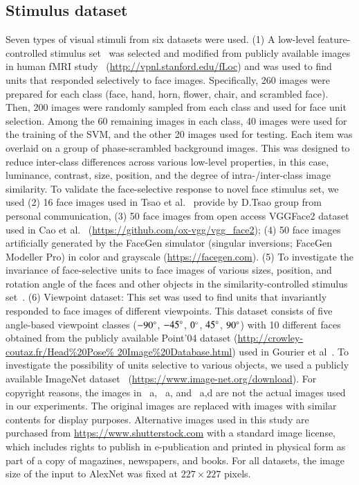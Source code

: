 \documentclass[final,3p,times,twocolumn]{elsarticle}
\begin{document}
\subsection{Stimulus dataset}
Seven types of visual stimuli from six datasets were used.
(1) A low-level feature-controlled stimulus set~\cite{stigliani2015temporal} was selected and modified from publicly available images in human fMRI study~\cite{stigliani2015temporal} (\url{http://vpnl.stanford.edu/fLoc}) 
and was used to find units that responded selectively to face images.
Specifically, 260 images were prepared for each class (face, hand, horn, flower, chair, and scrambled face).
Then, 200 images were randomly sampled from each class and used for face unit selection.
Among the 60 remaining images in each class, 40 images were used for the training of the SVM, 
and the other 20 images used for testing.
Each item was overlaid on a group of phase-scrambled background images.
This was designed to reduce inter-class differences across various low-level properties,
in this case, luminance, contrast, size, position, and the degree of intra-/inter-class image similarity.
To validate the face-selective response to novel face stimulus set, we used (2) 16 face images used in Tsao et al.~\cite{tsao2006cortical,freiwald2010functional} provide by D.Tsao group from personal communication,
(3) 50 face images from open access VGGFace2 dataset used in Cao et al.~\cite{cao2018vggface2} (\url{https://github.com/ox-vgg/vgg_face2});
(4) 50 face images artificially generated by the FaceGen simulator (singular inversions; FaceGen Modeller Pro) in color and grayscale (\url{https://facegen.com}).
(5) To investigate the invariance of face-selective units to face images of various sizes, position, and rotation angle of the faces and other objects in the similarity-controlled stimulus set~\cite{stigliani2015temporal}.
(6) Viewpoint dataset: This set was used to find units that invariantly responded to face images of different viewpoints.
This dataset consists of five angle-based viewpoint classes ($ -90\degree $, $ -45\degree $, $ 0\degree $, $ 45\degree $, $ 90\degree $) with 10 different faces obtained from the publicly available Point'04 dataset (\url{http://crowley-coutaz.fr/Head%20Pose%	20Image%20Database.html}) used in Gourier et al~\cite{gourier2004estimating}.
To investigate the possibility of units selective to various objects, we used a publicly available ImageNet dataset~\cite{ILSVRC15} (\url{https://www.image-net.org/download}).
For copyright reasons, the images in ~a, ~a, and ~a,d are not the actual images used in our experiments.
The original images are replaced with images with similar contents for display purposes.
Alternative images used in this study are purchased from \url{https://www.shutterstock.com} with a standard image license, which includes rights to publish in e-publication and printed in physical form as part of a copy of magazines, newspapers, and books.
For all datasets, the image size of the input to AlexNet was fixed at $ 227 \times 227 $ pixels.
\end{document}
